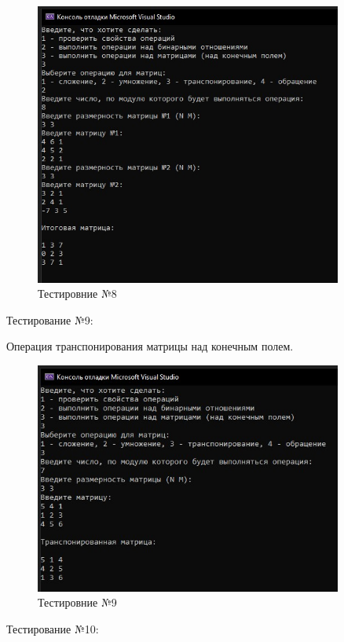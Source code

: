 \documentclass[bachelor, och, labwork]{shiza}
\begin{document}
\begin{figure}[H]
	\centering
	\includegraphics[width=0.9\textwidth]{test_8}
	\caption{Тестировние №8}
	\label{fig:test_8}
\end{figure}

	Тестирование №9:

Операция транспонирования матрицы над конечным полем.


\begin{figure}[H]
	\centering
	\includegraphics[width=0.9\textwidth]{test_9}
	\caption{Тестировние №9}
	\label{fig:test_9}
\end{figure}

	Тестирование №10:
\end{document}

